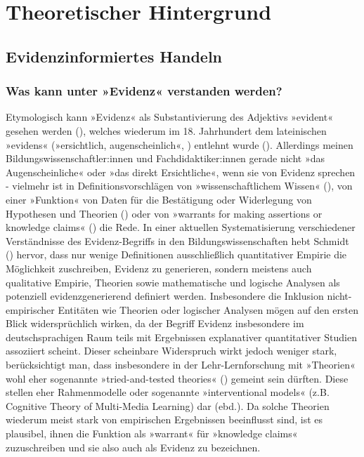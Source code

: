 \documentclass[
  jou,
  floatsintext,
  longtable,
  nolmodern,
  notxfonts,
  notimes,
  colorlinks=true,linkcolor=blue,citecolor=blue,urlcolor=blue]{apa7}
\begin{document}
\section{Theoretischer Hintergrund}\label{theoretischer-hintergrund}

\subsection{Evidenzinformiertes
Handeln}\label{evidenzinformiertes-handeln}

\subsubsection{Was kann unter »Evidenz« verstanden
werden?}\label{was-kann-unter-evidenz-verstanden-werden}

Etymologisch kann »Evidenz« als Substantivierung des Adjektivs »evident«
gesehen werden (), welches
wiederum im 18. Jahrhundert dem lateinischen »evidens« (»ersichtlich,
augenscheinlich«, ) entlehnt
wurde (). Allerdings meinen
Bildungswissenschaftler:innen und Fachdidaktiker:innen gerade nicht »das
Augenscheinliche« oder »das direkt Ersichtliche«, wenn sie von Evidenz
sprechen - vielmehr ist in Definitionsvorschlägen von
»wissenschaftlichem Wissen« (), von
einer »Funktion« von Daten für die Bestätigung oder Widerlegung von
Hypothesen und Theorien ()
oder von »warrants for making assertions or knowledge claims«
() die Rede. In
einer aktuellen Systematisierung verschiedener Verständnisse des
Evidenz-Begriffs in den Bildungswissenschaften hebt Schmidt
() hervor, dass nur wenige Definitionen
ausschließlich quantitativer Empirie die Möglichkeit zuschreiben,
Evidenz zu generieren, sondern meistens auch qualitative Empirie,
Theorien sowie mathematische und logische Analysen als potenziell
evidenzgenerierend definiert werden. Insbesondere die Inklusion
nicht-empirischer Entitäten wie Theorien oder logischer Analysen mögen
auf den ersten Blick widersprüchlich wirken, da der Begriff Evidenz
insbesondere im deutschsprachigen Raum teils mit Ergebnissen
explanativer quantitativer Studien assoziiert scheint. Dieser scheinbare
Widerspruch wirkt jedoch weniger stark, berücksichtigt man, dass
insbesondere in der Lehr-Lernforschung mit »Theorien« wohl eher
sogenannte »tried-and-tested theories« () gemeint sein dürften. Diese stellen eher Rahmenmodelle oder
sogenannte »interventional models« (z.B. Cognitive Theory of Multi-Media
Learning) dar (ebd.). Da solche Theorien wiederum meist stark von
empirischen Ergebnissen beeinflusst sind, ist es plausibel, ihnen die
Funktion als »warrant« für »knowledge claims« zuzuschreiben und sie also
auch als Evidenz zu bezeichnen.
\end{document}
